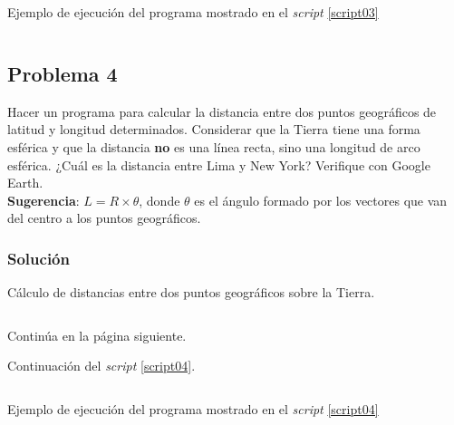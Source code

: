 \documentclass[a4paper,12pt,final]{article}
\begin{document}
      \newpage
      \begin{listing}[H]
        \caption{Ejemplo de ejecución del programa mostrado en el
        \emph{script} \ref{script03}}
        \label{script03sample}
        \inputminted{text}{./laboratorio_1/problema03_sample.txt}
      \end{listing}
      \vspace{\fill}

  \newpage
  \subsection*{Problema 4}
    \noindent Hacer un programa para calcular la distancia entre dos puntos
    geográficos de latitud y longitud determinados. Considerar que la
    Tierra tiene una forma esférica y que la distancia \textbf{no} es una
    línea recta, sino una longitud de arco esférica. ¿Cuál es la distancia
    entre Lima y New York? Verifique con Google Earth.\\

    \noindent\textbf{Sugerencia}: $L=R\times\theta$, donde $\theta$ es el ángulo
    formado por los vectores que van del centro a los puntos geográficos.

    \subsubsection*{Solución}
      \begin{listing}[H]
        \caption{Cálculo de distancias entre dos puntos geográficos sobre la
        Tierra.}
        \label{script04}
        \inputminted[firstline=5,lastline=43]{matlab}{./laboratorio_1/problema04.m}
      \end{listing}
      \vspace{-1em}
      \noindent\small{Continúa en la página siguiente.}
      \vspace{\fill}

      \newpage
      \noindent\small{Continuación del \emph{script} \ref{script04}.}
      \vspace{-1em}
      \begin{listing}[H]
        \inputminted[firstline=45]{matlab}{./laboratorio_1/problema04.m}
      \end{listing}

      \begin{listing}[H]
        \caption{Ejemplo de ejecución del programa mostrado en el
        \emph{script} \ref{script04}}
        \label{script04sample}
        \inputminted{text}{./laboratorio_1/problema04_sample.txt}
      \end{listing}
      \vspace{\fill}
\end{document}
